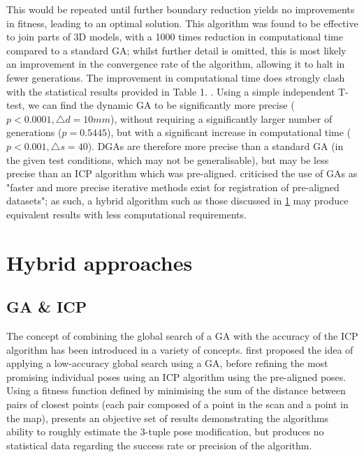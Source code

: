\documentclass[authoryearcitations]{UoYCSproject}
\begin{document}
This would be repeated until further boundary reduction yields no improvements in fitness, leading to an optimal solution. This algorithm was found to be effective to join parts of 3D models, with a 1000 times reduction in computational time compared to a standard GA; whilst further detail is omitted, this is most likely an improvement in the convergence rate of the algorithm, allowing it to halt in fewer generations. The improvement in computational time does strongly clash with the statistical results provided in Table 1. \cite{Chow2004-xc}. Using a simple independent T-test, we can find the dynamic GA to be significantly more precise ($p<0.0001, \triangle d = 10mm$), without requiring a significantly larger number of generations ($p=0.5445$), but with a significant increase in computational time ($p<0.001, \triangle s = 40$). DGAs are therefore more precise than a standard GA (in the given test conditions, which may not be generalisable), but may be less precise than an ICP algorithm which was pre-aligned. \citet{Lomonosov2006-vq} criticised the use of GAs as "faster and more precise iterative methods exist for registration of pre-aligned datasets"; as such, a hybrid algorithm such as those discussed in \ref{sec:hybrid_approaches} may produce equivalent results with less computational requirements.

\section{Hybrid approaches}
\label{sec:hybrid_approaches}
\subsection{GA \& ICP}
The concept of combining the global search of a GA with the accuracy of the ICP algorithm has been introduced in a variety of concepts. \citet{Brunnstrom1996-vo} first proposed the idea of applying a low-accuracy global search using a GA, before refining the most promising individual poses using an ICP algorithm using the pre-aligned poses. Using a fitness function defined by minimising the sum of the distance between pairs of closest points (each pair composed of a point in the scan and a point in the map), \citeauthor{Brunnstrom1996-vo} presents an objective set of results demonstrating the algorithms ability to roughly estimate the 3-tuple pose modification, but produces no statistical data regarding the success rate or precision of the algorithm. 
\end{document}
